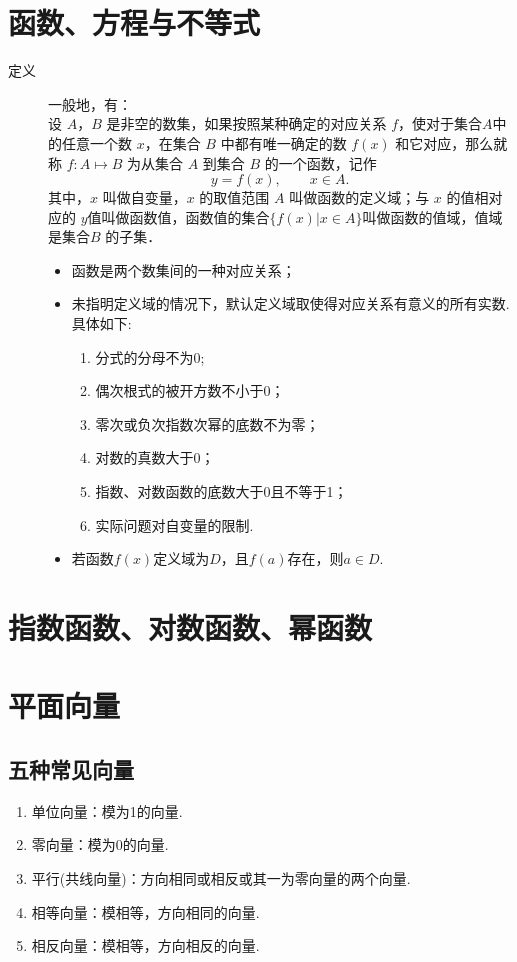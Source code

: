 \section{函数、方程与不等式}
  \begin{description}
    \item [定义] 一般地，有：\\
      设 $A$，$B$ 是非空的数集，如果按照某种确定的对应关系 $f$，使对于集合$A$中的任意一个数 $x$，在集合 $B$ 中都有唯一确定的数 $f(x)$ 和它对应，那么就称 $f\colon A\mapsto B$ 为从集合 $A$ 到集合 $B$ 的一个函数，记作
      $$y=f(x),\qquad x\in A.$$
      其中，$x$ 叫做自变量，$x$ 的取值范围 $A$ 叫做函数的定义域；与 $x$ 的值相对应的 $y $值叫做函数值，函数值的集合$\{f(x)|x\in A\}$叫做函数的值域，值域是集合$B$ 的子集．
      \begin{itemize}[leftmargin=*]
        \kaishu
        \item 函数是两个数集间的一种对应关系；
        \item 未指明定义域的情况下，默认定义域取使得对应关系有意义的所有实数. 具体如下:
        \begin{enumerate}[label=\circled{\arabic*}]
          \item 分式的分母不为0;
          \item 偶次根式的被开方数不小于0；
          \item 零次或负次指数次幂的底数不为零；
          \item 对数的真数大于0；
          \item 指数、对数函数的底数大于0且不等于1；
          \item 实际问题对自变量的限制.
        \end{enumerate}
        \item 若函数$f(x)$定义域为$D$，且$f(a)$存在，则$a\in D$.
      \end{itemize}
  \end{description}
\section{指数函数、对数函数、幂函数}
\section{平面向量}
  \subsection{五种常见向量}
    \begin{enumerate}[label=\arabic*)]
      \item 单位向量：模为1的向量.
      \item 零向量：模为0的向量.
      \item 平行(共线向量)：方向相同或相反或其一为零向量的两个向量.
      \item 相等向量：模相等，方向相同的向量.
      \item 相反向量：模相等，方向相反的向量.
    \end{enumerate}
